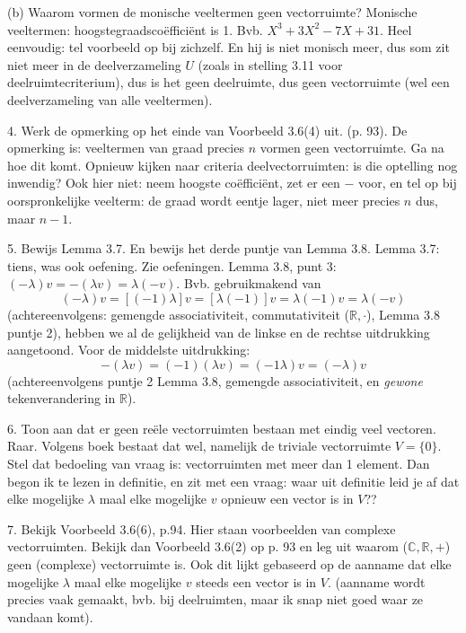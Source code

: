 \documentclass{article}
\begin{document}
(b) Waarom vormen de monische veeltermen geen vectorruimte?
Monische veeltermen: hoogstegraadsco\"effici\"ent is 1. Bvb. $X^3 + 3X^2 -7X + 31$. 
Heel eenvoudig: tel voorbeeld op bij zichzelf. En hij is niet monisch meer, dus som zit niet meer in de deelverzameling $U$ (zoals in stelling 3.11 voor deelruimtecriterium), dus is het geen deelruimte, dus geen vectorruimte (wel een deelverzameling van alle veeltermen).  



4. Werk de opmerking op het einde van Voorbeeld 3.6(4) uit. (p. 93). De opmerking is: veeltermen van graad precies $n$ vormen geen vectorruimte. Ga na hoe dit komt. Opnieuw kijken naar criteria deelvectorruimten: is die optelling nog inwendig? Ook hier niet: neem hoogste co\"effici\"ent, zet er een $-$ voor, en tel op bij oorspronkelijke veelterm: de graad wordt eentje lager, niet meer precies $n$ dus, maar $n-1$. 

5. Bewijs Lemma 3.7. En bewijs het derde puntje van Lemma 3.8. 
Lemma 3.7: tiens, was ook oefening. Zie oefeningen. 
Lemma 3.8, punt 3: $(-\lambda)v = -(\lambda v) = \lambda(-v)$. Bvb. gebruikmakend van 
\[ (-\lambda)v = [(-1)\lambda]v = [\lambda (-1)]v = \lambda(-1)v = \lambda(-v) \]
(achtereenvolgens: gemengde associativiteit, commutativiteit ($\mathbb{R},\cdot$), Lemma 3.8 puntje 2), hebben we al de gelijkheid van de linkse en de rechtse uitdrukking aangetoond. 
Voor de middelste uitdrukking: 
\[
-(\lambda v) = (-1)(\lambda v) = (-1 \lambda) v = (- \lambda)v
\]
(achtereenvolgens puntje 2 Lemma 3.8, gemengde associativiteit, en \emph{gewone} tekenverandering in $\mathbb{R}$). 

6. Toon aan dat er geen re\"ele vectorruimten bestaan met eindig veel vectoren.
Raar. Volgens boek bestaat dat wel, namelijk de triviale vectorruimte $V=\{0\}$. 
Stel dat bedoeling van vraag is: vectorruimten met meer dan 1 element. Dan begon ik te lezen in definitie, en zit met een vraag: waar uit definitie leid je af dat elke mogelijke $\lambda$ maal elke mogelijke $v$ opnieuw een vector is in $V$?? 


7. Bekijk Voorbeeld 3.6(6), p.94. Hier staan voorbeelden van complexe vectorruimten. 
Bekijk dan Voorbeeld 3.6(2) op p. 93 en leg uit waarom ($\mathbb{C}, \mathbb{R}, +$) geen (complexe) vectorruimte is.
Ook dit lijkt gebaseerd op de aanname dat elke mogelijke $\lambda$ maal elke mogelijke $v$ steeds een vector is in $V$. (aanname wordt precies vaak gemaakt, bvb. bij deelruimten, maar ik snap niet goed waar ze vandaan komt). 
\end{document}
